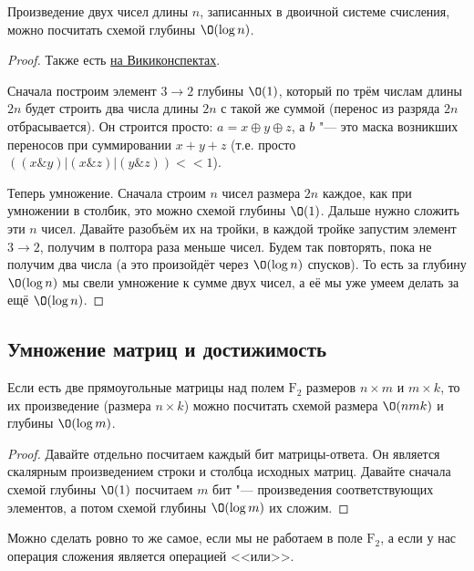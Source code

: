 	\begin{theorem}
		Произведение двух чисел длины $n$, записанных в двоичной системе счисления, можно посчитать схемой глубины $\O(\log n)$.
	\end{theorem}
	\begin{proof}
		Также есть \href{http://neerc.ifmo.ru/wiki/index.php?title=\%D0\%94\%D0\%B5\%D1\%80\%D0\%B5\%D0\%B2\%D0\%BE_\%D0\%A3\%D0\%BE\%D0\%BB\%D0\%BB\%D0\%B5\%D1\%81\%D0\%B0}{на Викиконспектах}.

		Сначала построим элемент $3 \to 2$ глубины $\O(1)$, который по трём числам длины $2n$ будет строить два числа длины $2n$ с такой же суммой (перенос из разряда $2n$ отбрасывается).
		Он строится просто: $a = x \oplus y \oplus z$, а $b$ "--- это маска возникших переносов при суммировании $x+y+z$ (т.е. просто $((x \& y) | (x \& z) | (y \& z)) << 1$).

		Теперь умножение.
		Сначала строим $n$ чисел размера $2n$ каждое, как при умножении в столбик, это можно схемой глубины $\O(1)$.
		Дальше нужно сложить эти $n$ чисел.
		Давайте разобъём их на тройки, в каждой тройке запустим элемент $3 \to 2$, получим в полтора раза меньше чисел.
		Будем так повторять, пока не получим два числа (а это произойдёт через $\O(\log n)$ спусков).
		То есть за глубину $\O(\log n)$ мы свели умножение к сумме двух чисел, а её мы уже умеем делать за ещё $\O(\log n)$.
	\end{proof}

\subsection{Умножение матриц и достижимость}
	\begin{lemma}
		Если есть две прямоугольные матрицы над полем $\mathrm{F}_2$ размеров $n \times m$ и $m \times k$, то их произведение (размера $n \times k$)
		можно посчитать схемой размера $\O(nmk)$ и глубины $\O(\log m)$.
	\end{lemma}
	\begin{proof}
		Давайте отдельно посчитаем каждый бит матрицы-ответа.
		Он является скалярным произведением строки и столбца исходных матриц.
		Давайте сначала схемой глубины $\O(1)$ посчитаем $m$ бит "--- произведения соответствующих элементов, а потом схемой глубины $\O(\log m)$ их сложим.
	\end{proof}
	\begin{Rem}
		Можно сделать ровно то же самое, если мы не работаем в поле $\mathrm{F}_2$, а если у нас операция сложения является операцией <<или>>.
	\end{Rem}

